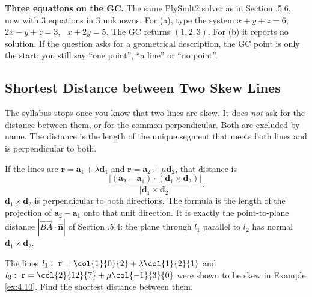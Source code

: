 \begin{info}
\textbf{Three equations on the GC.} The same PlySmlt2 solver as in Section \chapnum.5.6, now with $3$ equations in $3$ unknowns. For (a), type the system $x+y+z = 6$, \ $2x-y+z = 3$, \ $x+2y = 5$. The GC returns $(1,2,3)$. For (b) it reports no solution. If the question asks for a geometrical description, the GC point is only the start: you still say ``one point'', ``a line'' or ``no point''.
\end{info}

\clearpage
\subsection{Shortest Distance between Two Skew Lines}
The syllabus stops once you know that two lines are skew. It does \emph{not} ask for the distance between them, or for the common perpendicular. Both are excluded by name. The distance is the length of the unique segment that meets both lines and is perpendicular to both.

If the lines are $\mathbf{r} = \mathbf{a}_1 + \lambda\mathbf{d}_1$ and $\mathbf{r} = \mathbf{a}_2 + \mu\mathbf{d}_2$, that distance is
\[
\dfrac{\left|(\mathbf{a}_2-\mathbf{a}_1)\cdot(\mathbf{d}_1\times\mathbf{d}_2)\right|}{|\mathbf{d}_1\times\mathbf{d}_2|}.
\]
$\mathbf{d}_1\times\mathbf{d}_2$ is perpendicular to both directions. The formula is the length of the projection of $\mathbf{a}_2-\mathbf{a}_1$ onto that unit direction. It is exactly the point-to-plane distance $|\overrightarrow{BA}\cdot\hat{\mathbf{n}}|$ of Section \chapnum.5.4: the plane through $l_1$ parallel to $l_2$ has normal $\mathbf{d}_1\times\mathbf{d}_2$.

\begin{example}[label=ex:6.2]
The lines $l_1:\ \mathbf{r} = \col{1}{0}{2}+\lambda\col{1}{2}{1}$ and $l_3:\ \mathbf{r} = \col{2}{12}{7}+\mu\col{-1}{3}{0}$ were shown to be skew in Example \ref{ex:4.10}. Find the shortest distance between them.
\end{example}


